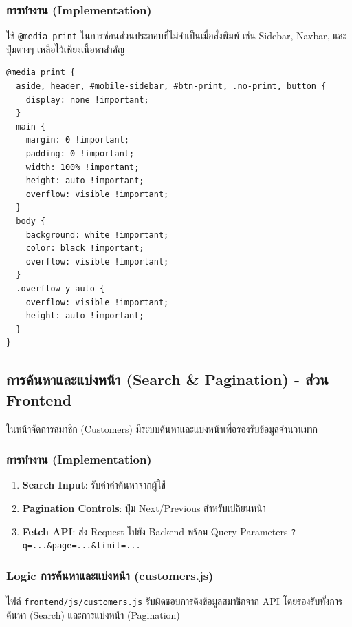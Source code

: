 \subsubsection{การทำงาน (Implementation)}
ใช้ \texttt{@media print} ในการซ่อนส่วนประกอบที่ไม่จำเป็นเมื่อสั่งพิมพ์ เช่น Sidebar, Navbar, และปุ่มต่างๆ เหลือไว้เพียงเนื้อหาสำคัญ

\begin{lstlisting}[caption={CSS @media print ใน logs.ejs}, label={code:media-print}]
@media print {
  aside, header, #mobile-sidebar, #btn-print, .no-print, button {
    display: none !important;
  }
  main {
    margin: 0 !important;
    padding: 0 !important;
    width: 100% !important;
    height: auto !important;
    overflow: visible !important;
  }
  body {
    background: white !important;
    color: black !important;
    overflow: visible !important;
  }
  .overflow-y-auto {
    overflow: visible !important;
    height: auto !important;
  }
}
\end{lstlisting}

\subsection{การค้นหาและแบ่งหน้า (Search \& Pagination) - ส่วน Frontend}
ในหน้าจัดการสมาชิก (Customers) มีระบบค้นหาและแบ่งหน้าเพื่อรองรับข้อมูลจำนวนมาก

\subsubsection{การทำงาน (Implementation)}
\begin{enumerate}
    \item \textbf{Search Input}: รับค่าคำค้นหาจากผู้ใช้
    \item \textbf{Pagination Controls}: ปุ่ม Next/Previous สำหรับเปลี่ยนหน้า
    \item \textbf{Fetch API}: ส่ง Request ไปยัง Backend พร้อม Query Parameters \texttt{?q=...\&page=...\&limit=...}
\end{enumerate}

\subsubsection{Logic การค้นหาและแบ่งหน้า (customers.js)}
ไฟล์ \texttt{frontend/js/customers.js} รับผิดชอบการดึงข้อมูลสมาชิกจาก API โดยรองรับทั้งการค้นหา (Search) และการแบ่งหน้า (Pagination)

